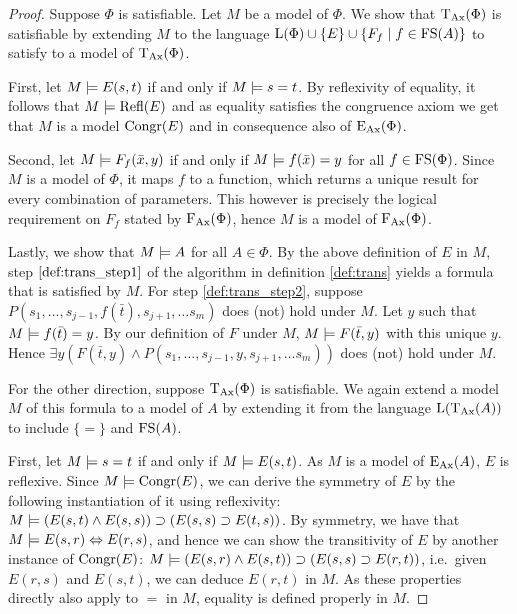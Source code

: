 \begin{proof}
	Suppose $\Phi$ is satisfiable.
	Let $M$ be a model of $\Phi$.
	We show that $\operatorname{\operatorname{T}_{Ax}}(\Phi)$ is satisfiable by extending $M$ to the language $\operatorname{L}(\Phi)\cup\{E\}\cup\{F_f\mid f \in \operatorname{FS}(A)\}$ to satisfy to a model of $\operatorname{\operatorname{T}_{Ax}}(\Phi)$.

	First, let $M \models E(s, t)$ if and only if $M \models s = t$.
	By reflexivity of equality, it follows that $M \models \operatorname{Refl}(E)$ and
	as equality satisfies the congruence axiom we get that $M$ is a model $\operatorname{Congr}(E)$ and in consequence also of $\operatorname{E_{Ax}}(\Phi)$.

	Second, let $M \models F_f(\bar x, y)$ if and only if $M \models f(\bar x) = y$ for all $f \in \operatorname{FS}(\Phi)$. 
	Since $M$ is a model of $\Phi$, it maps $f$ to a function, which returns a unique result for every combination of parameters.
	This however is precisely the logical requirement on $F_f$ stated by $\operatorname{F_{Ax}}(\Phi)$,   
	hence $M$ is a model of $\operatorname{F_{Ax}}(\Phi)$.

	Lastly, we show that $M \models A$ for all $A \in \Phi$.
	By the above definition of $E$ in $M$, step $\ref{def:trans_step1}$ of the algorithm in definition \ref{def:trans} yields a formula that is satisfied by $M$.
	For step \ref{def:trans_step2}, suppose $P(s_1, \ldots, s_{j-1}, f(\bar t),\allowbreak s_{j+1}, \ldots s_m)$ does (not) hold under $M$.
	Let $y$ such that $M \models f(\bar t)=y$.
	By our definition of $F$ under $M$, $M\models F(\bar t, y)$ with this unique $y$.
	Hence $\exists y (F(\bar t, y) \land P(s_1, \ldots, s_{j-1}, y, \allowbreak s_{j+1}, \ldots s_m))$ does (not) hold under $M$.


	For the other direction, suppose $\operatorname{\operatorname{T}_{Ax}}(\Phi)$ is satisfiable.
	We again extend a model $M$ of this formula to a model of $A$ by extending it from the language $\operatorname{L}(\operatorname{\operatorname{T}_{Ax}}(A))$ to include $\{=\}$ and $\operatorname{FS}(A)$.

	First, let $M\models s = t$ if and only if $M\models E(s, t)$.
	As $M$ is a model of $\operatorname{E_{Ax}}(A)$, $E$ is reflexive. 
	Since $M \models \operatorname{Congr}(E)$, we can derive the symmetry of $E$ by the following instantiation of it using reflexivity:
	$M \entails (E(s, t) \land E(s, s)) \limpl ( E(s, s) \limpl\nolinebreak E(t, s))$.
	By symmetry, we have that $M \models E(s, r) \Leftrightarrow E(r, s)$, and hence we can show the transitivity of $E$ by another instance of $\operatorname{Congr}(E)$: 
	$M \entails (E(s, r) \land E(s, t)) \limpl ( E(s, s) \limpl\nolinebreak E(r, t))$, i.e.\ given $E(r, s)$ and $E(s, t)$, we can deduce $E(r, t)$ in $M$.
	As these properties directly also apply to $=$ in $M$, equality is defined properly in $M$.


\end{proof}

